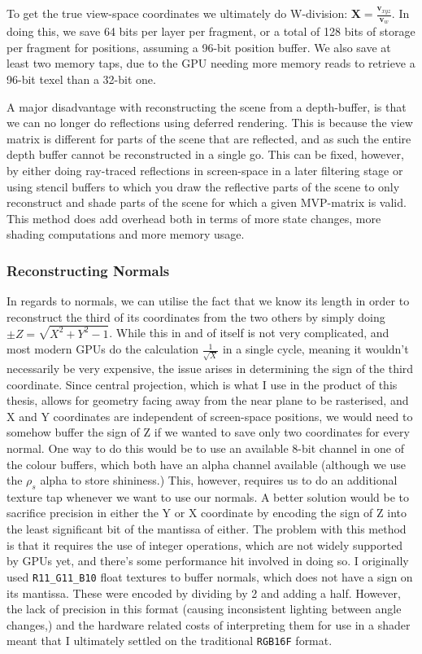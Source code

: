 To get the true view-space coordinates we ultimately do W-division: $\mathbf{X} = \frac{\mathbf{v}_{xyz}}{\mathbf{v}_w}$. In doing this, we save 64 bits per layer per fragment, or a total of 128 bits of storage per fragment for positions, assuming a 96-bit position buffer. We also save at least two memory taps, due to the GPU needing more memory reads to retrieve a 96-bit texel than a 32-bit one.

A major disadvantage with reconstructing the scene from a depth-buffer, is that we can no longer do reflections using deferred rendering. This is because the view matrix is different for parts of the scene that are reflected, and as such the entire depth buffer cannot be reconstructed in a single go. This can be fixed, however, by either doing ray-traced reflections in screen-space in a later filtering stage or using stencil buffers to which you draw the reflective parts of the scene to only reconstruct and shade parts of the scene for which a given MVP-matrix is valid. This method does add overhead both in terms of more state changes, more shading computations and more memory usage.

\subsubsection{Reconstructing Normals}
In regards to normals, we can utilise the fact that we know its length in order to reconstruct the third of its coordinates from the two others by simply doing $\pm Z = \sqrt{X^2 + Y^2 - 1}$. While this in and of itself is not very complicated, and most modern GPUs do the calculation $\frac{1}{\sqrt{X}}$ in a single cycle, meaning it wouldn't necessarily be very expensive, the issue arises in determining the sign of the third coordinate. Since central projection, which is what I use in the product of this thesis, allows for geometry facing away from the near plane to be rasterised, and X and Y coordinates are independent of screen-space positions, we would need to somehow buffer the sign of Z if we wanted to save only two coordinates for every normal. One way to do this would be to use an available 8-bit channel in one of the colour buffers, which both have an alpha channel available (although we use the $\rho_s$ alpha to store shininess.) This, however, requires us to do an additional texture tap whenever we want to use our normals. A better solution would be to sacrifice precision in either the Y or X coordinate by encoding the sign of Z into the least significant bit of the mantissa of either. The problem with this method is that it requires the use of integer operations, which are not widely supported by GPUs yet, and there's some performance hit involved in doing so.
I originally used \verb$R11_G11_B10$ float textures to buffer normals, which does not have a sign on its mantissa. These were encoded by dividing by 2 and adding a half. However, the lack of precision in this format (causing inconsistent lighting between angle changes,) and the hardware related costs of interpreting them for use in a shader meant that I ultimately settled on the traditional \verb$RGB16F$ format.

